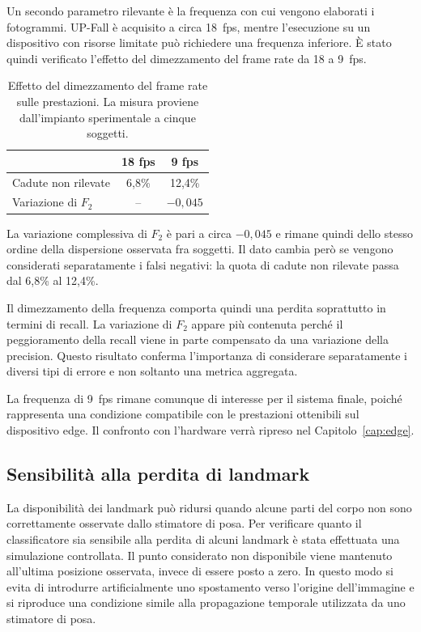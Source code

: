 Un secondo parametro rilevante è la frequenza con cui vengono elaborati i fotogrammi. UP-Fall è acquisito a circa 18~fps, mentre l'esecuzione su un dispositivo con risorse limitate può richiedere una frequenza inferiore. È stato quindi verificato l'effetto del dimezzamento del frame rate da 18 a 9~fps.

\begin{table}[ht]
\centering
\caption{Effetto del dimezzamento del frame rate sulle prestazioni. La misura
proviene dall'impianto sperimentale a cinque soggetti.}
\label{tab:framerate}
\begin{tabular}{lcc}
\toprule
 & \textbf{18 fps} & \textbf{9 fps} \\
\midrule
Cadute non rilevate & 6,8\% & 12,4\% \\
Variazione di $F_2$ & -- & $-0{,}045$ \\
\bottomrule
\end{tabular}
\end{table}

La variazione complessiva di $F_2$ è pari a circa $-0{,}045$ e rimane quindi dello stesso ordine della dispersione osservata fra soggetti. Il dato cambia però se vengono considerati separatamente i falsi negativi: la quota di cadute non rilevate passa dal 6,8\% al 12,4\%.

Il dimezzamento della frequenza comporta quindi una perdita soprattutto in termini di recall. La variazione di $F_2$ appare più contenuta perché il peggioramento della recall viene in parte compensato da una variazione della precision. Questo risultato conferma l'importanza di considerare separatamente i diversi tipi di errore e non soltanto una metrica aggregata.

La frequenza di 9~fps rimane comunque di interesse per il sistema finale, poiché rappresenta una condizione compatibile con le prestazioni ottenibili sul dispositivo edge. Il confronto con l'hardware verrà ripreso nel Capitolo~\ref{cap:edge}.

\subsection{Sensibilità alla perdita di landmark}
\label{sec:occlusioni}

La disponibilità dei landmark può ridursi quando alcune parti del corpo non sono correttamente osservate dallo stimatore di posa. Per verificare quanto il classificatore sia sensibile alla perdita di alcuni landmark è stata effettuata una simulazione controllata. Il punto considerato non disponibile viene mantenuto all'ultima posizione osservata, invece di essere posto a zero. In questo modo si evita di introdurre artificialmente uno spostamento verso l'origine dell'immagine e si riproduce una condizione simile alla propagazione temporale utilizzata da uno stimatore di posa.

